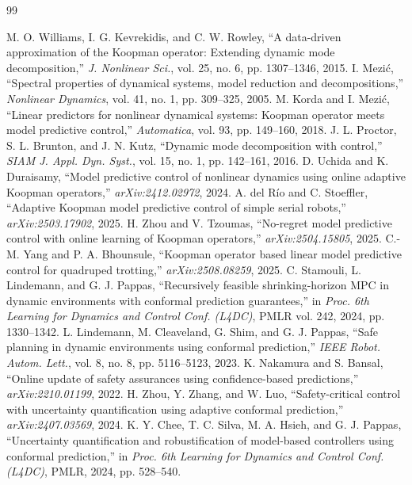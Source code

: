 \documentclass[10pt,conference]{IEEEtran}
\begin{document}
\begin{thebibliography}{99}
\scriptsize

 M. O. Williams, I. G. Kevrekidis, and C. W. Rowley, ``A data-driven approximation of the Koopman operator: Extending dynamic mode decomposition,'' \emph{J. Nonlinear Sci.}, vol. 25, no. 6, pp. 1307--1346, 2015.
 I. Mezi\'c, ``Spectral properties of dynamical systems, model reduction and decompositions,'' \emph{Nonlinear Dynamics}, vol. 41, no. 1, pp. 309--325, 2005.
 M. Korda and I. Mezi\'c, ``Linear predictors for nonlinear dynamical systems: Koopman operator meets model predictive control,'' \emph{Automatica}, vol. 93, pp. 149--160, 2018.
 J. L. Proctor, S. L. Brunton, and J. N. Kutz, ``Dynamic mode decomposition with control,'' \emph{SIAM J. Appl. Dyn. Syst.}, vol. 15, no. 1, pp. 142--161, 2016.
 D. Uchida and K. Duraisamy, ``Model predictive control of nonlinear dynamics using online adaptive Koopman operators,'' \emph{arXiv:2412.02972}, 2024.
 A. del R\'io and C. Stoeffler, ``Adaptive Koopman model predictive control of simple serial robots,'' \emph{arXiv:2503.17902}, 2025.
 H. Zhou and V. Tzoumas, ``No-regret model predictive control with online learning of Koopman operators,'' \emph{arXiv:2504.15805}, 2025.
 C.-M. Yang and P. A. Bhounsule, ``Koopman operator based linear model predictive control for quadruped trotting,'' \emph{arXiv:2508.08259}, 2025.
 C. Stamouli, L. Lindemann, and G. J. Pappas, ``Recursively feasible shrinking-horizon MPC in dynamic environments with conformal prediction guarantees,'' in \emph{Proc. 6th Learning for Dynamics and Control Conf. (L4DC)}, PMLR vol. 242, 2024, pp. 1330--1342.
 L. Lindemann, M. Cleaveland, G. Shim, and G. J. Pappas, ``Safe planning in dynamic environments using conformal prediction,'' \emph{IEEE Robot. Autom. Lett.}, vol. 8, no. 8, pp. 5116--5123, 2023.
 K. Nakamura and S. Bansal, ``Online update of safety assurances using confidence-based predictions,'' \emph{arXiv:2210.01199}, 2022.
 H. Zhou, Y. Zhang, and W. Luo, ``Safety-critical control with uncertainty quantification using adaptive conformal prediction,'' \emph{arXiv:2407.03569}, 2024.
 K. Y. Chee, T. C. Silva, M. A. Hsieh, and G. J. Pappas, ``Uncertainty quantification and robustification of model-based controllers using conformal prediction,'' in \emph{Proc. 6th Learning for Dynamics and Control Conf. (L4DC)}, PMLR, 2024, pp. 528--540.

\end{thebibliography}
\end{document}
